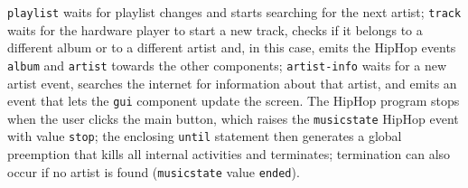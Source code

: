 \documentclass{llncs}
\begin{document}
{\texttt{playlist{}}} waits for playlist changes and starts
searching for the next artist; {\texttt{track{}}} waits for the
hardware player to start a new track, checks if it belongs to a
different album or to a different artist and, in this case, emits the
HipHop events \texttt{album} and \texttt{artist} towards the other
components; {\texttt{artist-info{}}} waits for a new artist
event, searches the internet for information about that artist, and
emits an event that lets the {\texttt{gui{}}} component update
the screen.  The HipHop program stops when the user clicks the main
{\textbf{{\footnotesize{{\footnotesize{}}}}}} button,
which raises the {\texttt{musicstate}} HipHop event with value
{\texttt{stop}}; the enclosing \texttt{until{}} statement then
generates a global preemption that kills all internal activities and
terminates; termination can also occur if no artist is found
(\texttt{musicstate} value \texttt{ended}).
\end{document}
